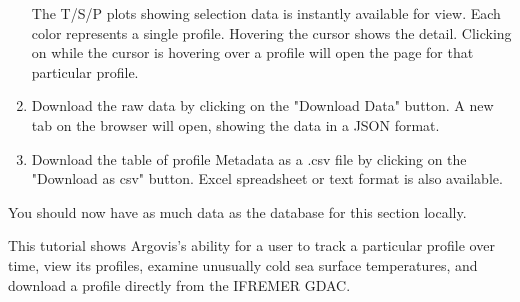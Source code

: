 \begin{enumerate}
The T/S/P plots showing selection data is instantly available for view. Each color represents a single profile. Hovering the cursor shows the detail. Clicking on while the cursor is hovering over a profile will open the page for that particular profile. 

\item Download the raw data by clicking on the "Download Data" button. A new tab on the browser will open, showing the data in a JSON format.

\item Download the table of profile Metadata as a .csv file by clicking on the "Download as csv" button. Excel spreadsheet or text format is also available.

\end{enumerate}

You should now have as much data as the database for this section locally. 



This tutorial shows Argovis's ability for a user to track a particular profile over time, view its profiles, examine unusually cold sea surface temperatures, and download a profile directly from the IFREMER GDAC.

